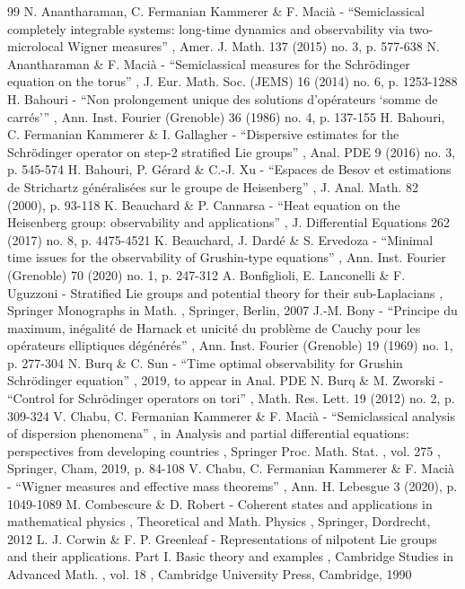 \documentclass[10pt]{amsart}
\theoremstyle{plain}
\theoremstyle{definition}
\begin{document}
\begin{thebibliography}{99}
 N. Anantharaman, C. Fermanian Kammerer \& F. Macià - “Semiclassical completely integrable systems: long-time dynamics and observability via two-microlocal Wigner measures” , Amer. J. Math. 137 (2015) no. 3, p. 577-638
 N. Anantharaman \& F. Macià - “Semiclassical measures for the Schrödinger equation on the torus” , J. Eur. Math. Soc. (JEMS) 16 (2014) no. 6, p. 1253-1288
 H. Bahouri - “Non prolongement unique des solutions d’opérateurs ‘somme de carrés’” , Ann. Inst. Fourier (Grenoble) 36 (1986) no. 4, p. 137-155
 H. Bahouri, C. Fermanian Kammerer \& I. Gallagher - “Dispersive estimates for the Schrödinger operator on step-2 stratified Lie groups” , Anal. PDE 9 (2016) no. 3, p. 545-574
 H. Bahouri, P. Gérard \& C.-J. Xu - “Espaces de Besov et estimations de Strichartz généralisées sur le groupe de Heisenberg” , J. Anal. Math. 82 (2000), p. 93-118
 K. Beauchard \& P. Cannarsa - “Heat equation on the Heisenberg group: observability and applications” , J. Differential Equations 262 (2017) no. 8, p. 4475-4521
 K. Beauchard, J. Dardé \& S. Ervedoza - “Minimal time issues for the observability of Grushin-type equations” , Ann. Inst. Fourier (Grenoble) 70 (2020) no. 1, p. 247-312
 A. Bonfiglioli, E. Lanconelli \& F. Uguzzoni - Stratified Lie groups and potential theory for their sub-Laplacians , Springer Monographs in Math. , Springer, Berlin, 2007
 J.-M. Bony - “Principe du maximum, inégalité de Harnack et unicité du problème de Cauchy pour les opérateurs elliptiques dégénérés” , Ann. Inst. Fourier (Grenoble) 19 (1969) no. 1, p. 277-304
 N. Burq \& C. Sun - “Time optimal observability for Grushin Schrödinger equation” , 2019, to appear in Anal. PDE
 N. Burq \& M. Zworski - “Control for Schrödinger operators on tori” , Math. Res. Lett. 19 (2012) no. 2, p. 309-324
 V. Chabu, C. Fermanian Kammerer \& F. Macià - “Semiclassical analysis of dispersion phenomena” , in Analysis and partial differential equations: perspectives from developing countries , Springer Proc. Math. Stat. , vol. 275 , Springer, Cham, 2019, p. 84-108
 V. Chabu, C. Fermanian Kammerer \& F. Macià - “Wigner measures and effective mass theorems” , Ann. H. Lebesgue 3 (2020), p. 1049-1089
 M. Combescure \& D. Robert - Coherent states and applications in mathematical physics , Theoretical and Math. Physics , Springer, Dordrecht, 2012
 L. J. Corwin \& F. P. Greenleaf - Representations of nilpotent Lie groups and their applications. Part I. Basic theory and examples , Cambridge Studies in Advanced Math. , vol. 18 , Cambridge University Press, Cambridge, 1990

\end{thebibliography}
\end{document}
